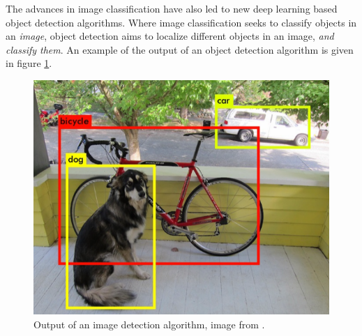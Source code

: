 \vspace{3mm}

The advances in image classification have also led to new deep learning based object detection algorithms. Where image classification seeks to classify objects in an \textit{image}, object detection aims to localize different objects in an image, \textit{and classify them}. An example of the output of an object detection algorithm is given in figure \ref{fig:imdet}. 

\begin{figure}[h!]
\centering
\includegraphics[scale=0.3]{images/imdet.png}
\caption{Output of an image detection algorithm, image from \citep{YOLOv1}.}
\label{fig:imdet}
\end{figure}


\newpage




\cleardoublepage